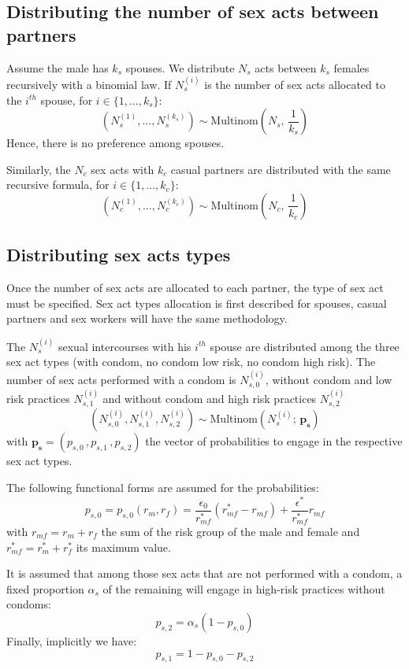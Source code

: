 \documentclass[11pt, onecolumn]{article}
\begin{document}
\subsection{Distributing the number of sex acts between partners}

Assume the male has $k_s$ spouses. We distribute $N_s$ acts between $k_s$ females recursively with a binomial law. If $N^{(i)}_s$ is the number of sex acts allocated to the $i^{th}$ spouse, for $i \in \{1,...,k_s\}$:
$$ \left(N^{(1)}_s,...,N^{(k_s)}_s \right)\sim \mathrm{Multinom}\left(N_s, \, \frac{1}{k_s}\right)$$
Hence, there is no preference among spouses. 

Similarly, the $N_c$ sex acts with $k_c$ casual partners are distributed with the same recursive formula, for $i \in \{1,...,k_c\}$:
$$ \left(N^{(1)}_c,...,N^{(k_c)}_c \right)\sim \mathrm{Multinom}\left(N_c, \, \frac{1}{k_c}\right)$$


\subsection{Distributing sex acts types}

Once the number of sex acts are allocated to each partner, the type of sex act must be specified.
Sex act types allocation is first described for spouses, casual partners and sex workers will have the same methodology.

The $N^{(i)}_s$ sexual intercourses with his $i^{th}$ spouse are distributed among the three sex act types (with condom, no condom low risk, no condom high risk). The number of sex acts performed with a condom is $N^{(i)}_{s,0}$, without condom and low risk practices $N^{(i)}_{s,1}$ and without condom and high risk practices $N^{(i)}_{s,2}$
$$\left(N^{(i)}_{s,0},N^{(i)}_{s,1},N^{(i)}_{s,2}\right) \sim \mathrm{Multinom}(N^{(i)}_s;\, \mathbf{p_s}) $$
with $\mathbf{p_s}=(p_{s,0}\,,p_{s,1}\,,p_{s,2})$ the vector of probabilities to engage in the respective sex act types.

The following functional forms are assumed for the probabilities:
$$p_{s,0}=p_{s,0} (r_m,r_f) = \frac{\epsilon_0}{r_{mf}^*}(r_{mf}^*-r_{mf}) + \frac{\epsilon^*}{r_{mf}^*}r_{mf}$$ 
with $r_{mf} = r_m+r_f$ the sum of the risk group of the male and female and $r_{mf}^* = r_m^*+r_f^*$ its maximum value.

It is assumed that among those sex acts that are not performed with a condom, a fixed proportion $\alpha_s$ of the remaining will engage in high-risk practices without condoms:
$$p_{s,2} = \alpha_s (1-p_{s,0})$$ 
Finally, implicitly we have:
$$p_{s,1} = 1-p_{s,0}-p_{s,2}$$ 
\end{document}
